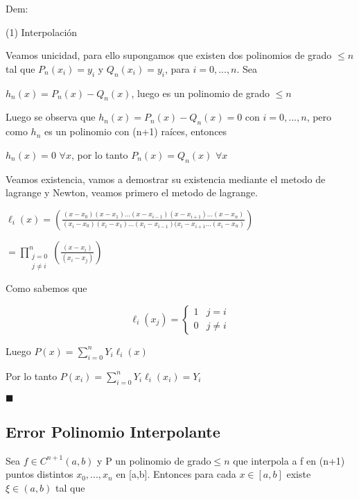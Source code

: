 \documentclass{article}
\begin{document}
Dem:

(1) Interpolación

Veamos unicidad, para ello supongamos que existen dos polinomios de grado $\leq n$ tal que $P_n(x_i) = y_i$ y 
$Q_n(x_i) = y_i$, para $i=0,...,n$. Sea 

\vspace{5mm}

$h_n(x) = P_n(x)-Q_n(x) $, luego es un polinomio de grado $\leq n$

Luego se observa que $h_n(x) = P_n(x)-Q_n(x) = 0$ con $i=0,...,n$, pero como $h_n$ es un polinomio con (n+1) raíces,
entonces

 $h_n(x) = 0 $ $\forall x$, por lo tanto $P_n(x) = Q_n(x) $ $\forall x$

\vspace{5mm}

Veamos existencia, vamos a demostrar su existencia mediante el metodo de lagrange y Newton, veamos primero el metodo de lagrange.

$\ell_i(x) = \left( \displaystyle\frac{(x-x_0)(x-x_1)...(x-x_{i-1})(x-x_{i+1})...(x-x_n)}{(x_i-x_0)(x_i-x_1)...(x_i-x_{i-1})(x_i-x_{i+1}...(x_i-x_n)} \right)  $

 $ = \prod\limits_{\substack{j=0 \\ j\neq i}}^{n} \left( \displaystyle\frac{(x-x_i)}{(x_i-x_j)} \right) $

 Como sabemos que

 $$
\ell_i(x_j)=
\begin{cases}
1 & j=i\\
0 & j\not=i
\end{cases}
$$

Luego  $P(x) = \sum\limits_{i=0}^n Y_i\ell_i(x)$

Por lo tanto $P(x_i) =\sum\limits_{i=0}^n Y_i\ell_i(x_i) = Y_i $

$\blacksquare$





\vspace{10mm}

\subsection{Error Polinomio Interpolante}\label{Error-Polinomio-Interpolante}

Sea  $f \in C^{n+1}(a,b)$ y P un polinomio de grado$\leq n$ que interpola a f en (n+1) puntos distintos 
$x_0,...,x_n$ en [a,b]. Entonces para cada $x \in [a,b]$ existe $\xi \in (a,b)$ tal que
\end{document}
